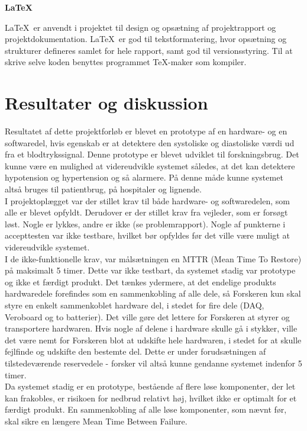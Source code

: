 \textbf{\LaTeX}

\LaTeX\ er anvendt i projektet til design og opsætning af projektrapport og projektdokumentation. \LaTeX\ er god til tekstformatering, hvor opsætning og strukturer defineres samlet for hele rapport, samt god til versionsstyring. Til at skrive selve koden benyttes programmet TeX-maker som kompiler. 

\section{Resultater og diskussion}
Resultatet af dette projektforløb er blevet en prototype af en hardware- og en softwaredel, hvis egenskab er at detektere den systoliske og diastoliske værdi ud fra et blodtrykssignal. Denne prototype er blevet udviklet til forskningsbrug. Det kunne være en mulighed at videreudvikle systemet således, at det kan detektere hypotension og hypertension og så alarmere. På denne måde kunne systemet altså bruges til patientbrug, på hospitaler og lignende. \\
I projektoplægget var der stillet krav til både hardware- og softwaredelen, som alle er blevet opfyldt. Derudover er der stillet krav fra vejleder, som er forsøgt løst. Nogle er lykkes, andre er ikke (se problemrapport). Nogle af punkterne i accepttesten var ikke testbare, hvilket bør opfyldes før det ville være muligt at videreudvikle systemet. \\
I de ikke-funktionelle krav, var målsætningen en MTTR (Mean Time To Restore) på maksimalt 5 timer. Dette var ikke testbart, da systemet stadig var prototype og ikke et færdigt produkt.
Det tænkes ydermere, at det endelige produkts hardwaredele forefindes som en sammenkobling af alle dele, så Forskeren kun skal styre en enkelt sammenkoblet hardware del, i stedet for fire dele (DAQ, Veroboard og to batterier). Det ville gøre det lettere for Forskeren at styrer og transportere hardwaren. Hvis nogle af delene i hardware skulle gå i stykker, ville det være nemt for Forskeren blot at udskifte hele hardwaren, i stedet for at skulle fejlfinde og udskifte den bestemte del. Dette er under forudsætningen af tilstedeværende reservedele - forsker vil altså kunne gendanne systemet indenfor 5 timer. \\
Da systemet stadig er en prototype, bestående af flere løse komponenter, der let kan frakobles, er risikoen for nedbrud relativt høj, hvilket ikke er optimalt for et færdigt produkt. En sammenkobling af alle løse komponenter, som nævnt før, skal sikre en længere Mean Time Between Failure. \\
